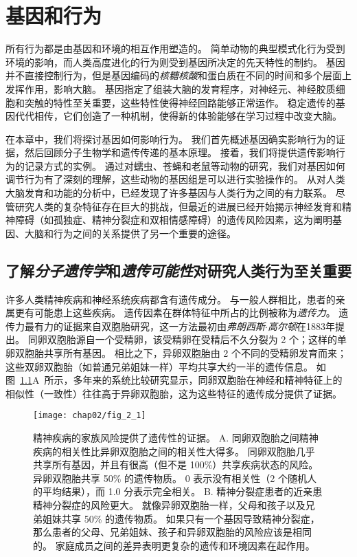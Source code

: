 \chapter{基因和行为} \label{chap:chap2}

所有行为都是由基因和环境的相互作用塑造的。
简单动物的典型模式化行为受到环境的影响，而人类高度进化的行为则受到基因所决定的先天特性的制约。
基因并不直接控制行为，但是基因编码的\textit{核糖核酸}和蛋白质在不同的时间和多个层面上发挥作用，影响大脑。
基因指定了组装大脑的发育程序，对神经元、神经胶质细胞和突触的特性至关重要，这些特性使得神经回路能够正常运作。
稳定遗传的基因代代相传，它们创造了一种机制，使得新的体验能够在学习过程中改变大脑。




在本章中，我们将探讨基因如何影响行为。
我们首先概述基因确实影响行为的证据，然后回顾分子生物学和遗传传递的基本原理。
接着，我们将提供遗传影响行为的记录方式的实例。
通过对蠕虫、苍蝇和老鼠等动物的研究，我们对基因如何调节行为有了深刻的理解，这些动物的基因组是可以进行实验操作的。
从对人类大脑发育和功能的分析中，已经发现了许多基因与人类行为之间的有力联系。
尽管研究人类的复杂特征存在巨大的挑战，但最近的进展已经开始揭示神经发育和精神障碍（如孤独症、精神分裂症和双相情感障碍）的遗传风险因素，这为阐明基因、大脑和行为之间的关系提供了另一个重要的途径。



\section{了解\textit{分子遗传学}和\textit{遗传可能性}对研究人类行为至关重要}

许多人类精神疾病和神经系统疾病都含有遗传成分。
与一般人群相比，患者的亲属更有可能患上这些疾病。
遗传因素在群体特征中所占的比例被称为\textit{遗传力}。
遗传力最有力的证据来自双胞胎研究，这一方法最初由\textit{弗朗西斯$\cdot$高尔顿}在1883年提出。
同卵双胞胎源自一个受精卵，该受精卵在受精后不久分裂为 2 个；这样的单卵双胞胎共享所有基因。
相比之下，异卵双胞胎由 2 个不同的受精卵发育而来；这些双卵双胞胎（如普通兄弟姐妹一样）平均共享大约一半的遗传信息。
如图~\ref{fig:2_1}A~所示，多年来的系统比较研究显示，同卵双胞胎在神经和精神特征上的相似性（一致性）往往高于异卵双胞胎，这为这些特征的遗传成分提供了证据。






\begin{figure}[htbp]
	\centering
	\texttt{[image: chap02/fig\_2\_1]}
	\caption{精神疾病的家族风险提供了遗传性的证据。
		A. 同卵双胞胎之间精神疾病的相关性比异卵双胞胎之间的相关性大得多。
		同卵双胞胎几乎共享所有基因，并且有很高（但不是 100\%）共享疾病状态的风险。
		异卵双胞胎共享 50\% 的遗传物质。
		0 表示没有相关性（2 个随机人的平均结果），而 1.0 分表示完全相关\cite{mcgue1998genetic}。
		B. 精神分裂症患者的近亲患精神分裂症的风险更大。
		就像异卵双胞胎一样，父母和孩子以及兄弟姐妹共享 50\% 的遗传物质。
		如果只有一个基因导致精神分裂症，那么患者的父母、兄弟姐妹、孩子和异卵双胞胎的风险应该是相同的。 
		家庭成员之间的差异表明更复杂的遗传和环境因素在起作用\cite{gottesman1991schizophrenia}。}
	\label{fig:2_1}
\end{figure}


